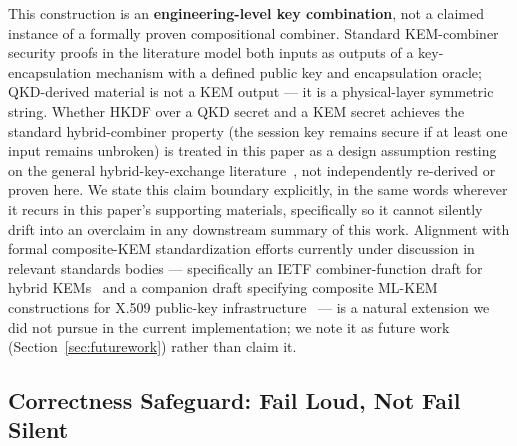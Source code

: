 \documentclass[journal]{IEEEtran}
\begin{document}
This construction is an \textbf{engineering-level key combination}, not a claimed instance of a formally proven compositional combiner. Standard KEM-combiner security proofs in the literature model both inputs as outputs of a key-encapsulation mechanism with a defined public key and encapsulation oracle; QKD-derived material is not a KEM output --- it is a physical-layer symmetric string. Whether HKDF over a QKD secret and a KEM secret achieves the standard hybrid-combiner property (the session key remains secure if at least one input remains unbroken) is treated in this paper as a design assumption resting on the general hybrid-key-exchange literature~\cite{focombiners2021,bestofbothkems2025}, not independently re-derived or proven here. We state this claim boundary explicitly, in the same words wherever it recurs in this paper's supporting materials, specifically so it cannot silently drift into an overclaim in any downstream summary of this work. Alignment with formal composite-KEM standardization efforts currently under discussion in relevant standards bodies --- specifically an IETF combiner-function draft for hybrid KEMs~\cite{ietf2026kemcombiners} and a companion draft specifying composite ML-KEM constructions for X.509 public-key infrastructure~\cite{ietf2026compositemlkem} --- is a natural extension we did not pursue in the current implementation; we note it as future work (Section~\ref{sec:futurework}) rather than claim it.

\subsection{Correctness Safeguard: Fail Loud, Not Fail Silent}
\label{sec:correctnesssafeguard}
\end{document}
